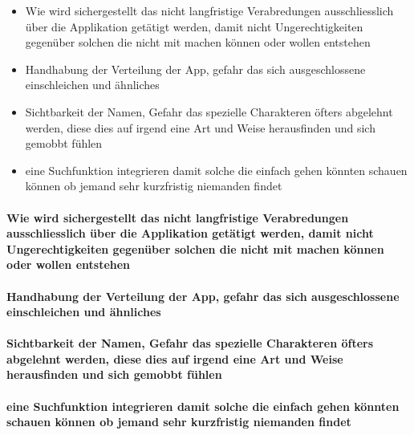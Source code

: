 \begin{itemize}
\item Wie wird sichergestellt das nicht langfristige Verabredungen ausschliesslich über die Applikation getätigt werden, damit nicht Ungerechtigkeiten gegenüber solchen die nicht mit machen können oder wollen entstehen
\item Handhabung der Verteilung der App, gefahr das sich ausgeschlossene einschleichen und ähnliches
\item Sichtbarkeit der Namen, Gefahr das spezielle Charakteren öfters abgelehnt werden, diese dies auf irgend eine Art und Weise herausfinden und sich gemobbt fühlen
\item eine Suchfunktion integrieren damit solche die einfach gehen könnten schauen können ob jemand sehr kurzfristig niemanden findet
\end{itemize}

\paragraph{Wie wird sichergestellt das nicht langfristige Verabredungen ausschliesslich über die Applikation getätigt werden, damit nicht Ungerechtigkeiten gegenüber solchen die nicht mit machen können oder wollen entstehen}
\vspace{3cm} 

\paragraph{Handhabung der Verteilung der App, gefahr das sich ausgeschlossene einschleichen und ähnliches}
\vspace{3cm} 

\paragraph{Sichtbarkeit der Namen, Gefahr das spezielle Charakteren öfters abgelehnt werden, diese dies auf irgend eine Art und Weise herausfinden und sich gemobbt fühlen}
\vspace{3cm} 

\paragraph{eine Suchfunktion integrieren damit solche die einfach gehen könnten schauen können ob jemand sehr kurzfristig niemanden findet}
\vspace{3cm} 
